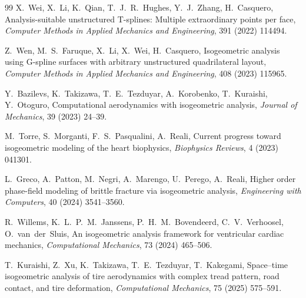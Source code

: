 \documentclass[review]{elsarticle}
\begin{document}
\begin{thebibliography}{99}
X.~Wei, X.~Li, K.~Qian, T.~J.~R.~Hughes, Y.~J.~Zhang, H.~Casquero,
Analysis-suitable unstructured T-splines: Multiple extraordinary points per face,
\emph{Computer Methods in Applied Mechanics and Engineering},
391 (2022) 114494.

Z.~Wen, M.~S.~Faruque, X.~Li, X.~Wei, H.~Casquero,
Isogeometric analysis using G-spline surfaces with arbitrary unstructured quadrilateral layout,
\emph{Computer Methods in Applied Mechanics and Engineering},
408 (2023) 115965.

Y.~Bazilevs, K.~Takizawa, T.~E.~Tezduyar, A.~Korobenko, T.~Kuraishi, Y.~Otoguro,
Computational aerodynamics with isogeometric analysis,
\emph{Journal of Mechanics},
39 (2023) 24--39.

M.~Torre, S.~Morganti, F.~S.~Pasqualini, A.~Reali,
Current progress toward isogeometric modeling of the heart biophysics,
\emph{Biophysics Reviews},
4 (2023) 041301.

L.~Greco, A.~Patton, M.~Negri, A.~Marengo, U.~Perego, A.~Reali,
Higher order phase-field modeling of brittle fracture via isogeometric analysis,
\emph{Engineering with Computers},
40 (2024) 3541--3560.

R.~Willems, K.~L.~P.~M.~Janssens, P.~H.~M.~Bovendeerd, C.~V.~Verhoosel, O.~van~der~Sluis,
An isogeometric analysis framework for ventricular cardiac mechanics,
\emph{Computational Mechanics},
73 (2024) 465--506.

T.~Kuraishi, Z.~Xu, K.~Takizawa, T.~E.~Tezduyar, T.~Kakegami,
Space--time isogeometric analysis of tire aerodynamics with complex tread pattern, road contact, and tire deformation,
\emph{Computational Mechanics},
75 (2025) 575--591.

\end{thebibliography}
\end{document}
